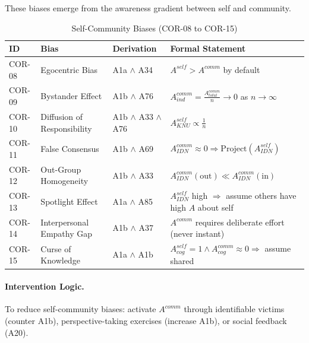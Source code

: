 These biases emerge from the awareness gradient between self and community.

\begin{table}[htbp]
\small
\centering
\caption{Self-Community Biases (COR-08 to COR-15)}
\label{tab:cor-self-comm}
\begin{tabular}{p{1.2cm}p{2.8cm}p{3.8cm}p{5cm}}
\toprule
\textbf{ID} & \textbf{Bias} & \textbf{Derivation} & \textbf{Formal Statement} \\
\midrule
COR-08 & Egocentric Bias & A1a $\land$ A34 & $A^{self} > A^{comm}$ by default \\
COR-09 & Bystander Effect & A1b $\land$ A76 & $A^{comm}_{ind} = \frac{A^{comm}_{total}}{n} \to 0$ as $n \to \infty$ \\
COR-10 & Diffusion of Responsibility & A1b $\land$ A33 $\land$ A76 & $A^{self}_{KNU} \propto \frac{1}{n}$ \\
COR-11 & False Consensus & A1b $\land$ A69 & $A^{comm}_{IDN} \approx 0 \Rightarrow \text{Project}(A^{self}_{IDN})$ \\
COR-12 & Out-Group Homogeneity & A1b $\land$ A33 & $A^{comm}_{IDN}(\text{out}) \ll A^{comm}_{IDN}(\text{in})$ \\
COR-13 & Spotlight Effect & A1a $\land$ A85 & $A^{self}_{IDN}$ high $\Rightarrow$ assume others have high $A$ about self \\
COR-14 & Interpersonal Empathy Gap & A1b $\land$ A37 & $A^{comm}$ requires deliberate effort (never instant) \\
COR-15 & Curse of Knowledge & A1a $\land$ A1b & $A^{self}_{cog} = 1 \land A^{comm}_{cog} \approx 0 \Rightarrow$ assume shared \\
\bottomrule
\end{tabular}
\end{table}

\paragraph{Intervention Logic.} To reduce self-community biases: activate $A^{comm}$ through identifiable victims (counter A1b), perspective-taking exercises (increase A1b), or social feedback (A20).


